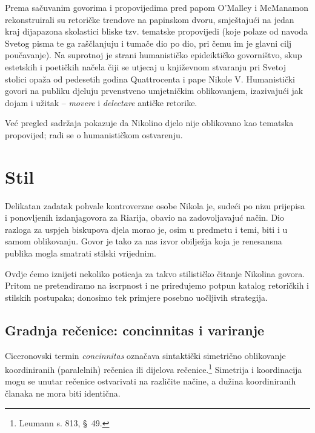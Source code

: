 \documentclass[a5paper,twoside]{article}
\begin{document}
Prema sačuvanim govorima i propovijedima pred papom O'Malley i McManamon rekonstruirali su retoričke trendove na papinskom dvoru, smještajući na jedan kraj dijapazona skolastici bliske tzv. tematske propovijedi (koje polaze od navoda Svetog pisma te ga raščlanjuju i tumače dio po dio, pri čemu im je glavni cilj poučavanje). Na suprotnoj je strani humanističko epideiktičko govorništvo, skup estetskih i poetičkih načela čiji se utjecaj u književnom stvaranju pri Svetoj stolici opaža od pedesetih godina Quattrocenta i pape Nikole V. Humanistički govori na publiku djeluju prvenstveno umjetničkim oblikovanjem, izazivajući jak dojam i užitak – \textit{movere} i \textit{delectare} antičke retorike. 

Već pregled sadržaja pokazuje da Nikolino djelo nije oblikovano kao tematska propovijed; radi se o humanističkom ostvarenju.


\section{Stil}


Delikatan zadatak pohvale kontroverzne osobe Nikola je, sudeći po nizu prijepisa i ponovljenih izdanjagovora za Riarija, obavio na zadovoljavajuć način. Dio razloga za uspjeh biskupova djela morao je, osim u predmetu i temi, biti i u samom oblikovanju. Govor je tako za nas izvor obilježja koja je renesansna publika mogla smatrati stilski vrijednim.

Ovdje ćemo iznijeti nekoliko poticaja za takvo stilističko čitanje Nikolina govora. Pritom ne pretendiramo na iscrpnost i ne priređujemo potpun katalog retoričkih i stilskih postupaka; donosimo tek primjere posebno uočljivih strategija.

\subsection{Gradnja rečenice: concinnitas i variranje}

Ciceronovski termin \textit{concinnitas} označava sintaktički simetrično oblikovanje koordiniranih (paralelnih) rečenica ili dijelova rečenice.\footnote{Leumann s. 813, §~49.} Simetrija i koordinacija mogu se unutar rečenice ostvarivati na različite načine, a dužina koordiniranih članaka ne mora biti identična.
\end{document}
